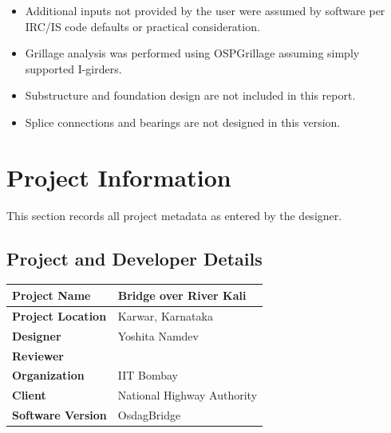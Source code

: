\documentclass[12pt,a4paper]{report}
\numberwithin{table}{chapter}
\numberwithin{figure}{chapter}
\begin{document}
\begin{itemize}
\item Additional inputs not provided by the user were assumed by software per IRC/IS code defaults or practical consideration.
\item Grillage analysis was performed using OSPGrillage assuming simply supported I-girders.
\item Substructure and foundation design are not included in this report.
\item Splice connections and bearings are not designed in this version.
\end{itemize}

\titleformat{\chapter}[block]{\normalfont\Large\bfseries\centering}{\thechapter}{1em}{}
\titlespacing*{\chapter}{0pt}{-30pt}{10pt}


\chapter{Project Information}

This section records all project metadata as entered by the designer.

\section{Project and Developer Details}
\label{sec:project-details}

\begin{tabular}{|L{5.5cm}|L{8.5cm}|}
\hline
\textbf{Project Name} & Bridge over River Kali \\
\hline
\textbf{Project Location} & Karwar, Karnataka \\
\hline
\textbf{Designer} & Yoshita Namdev \\
\hline
\textbf{Reviewer} &  \\
\hline
\textbf{Organization} & IIT Bombay \\
\hline
\textbf{Client} & National Highway Authority \\
\hline
\textbf{Software Version} & OsdagBridge \\
\hline
\end{tabular}
\end{document}
